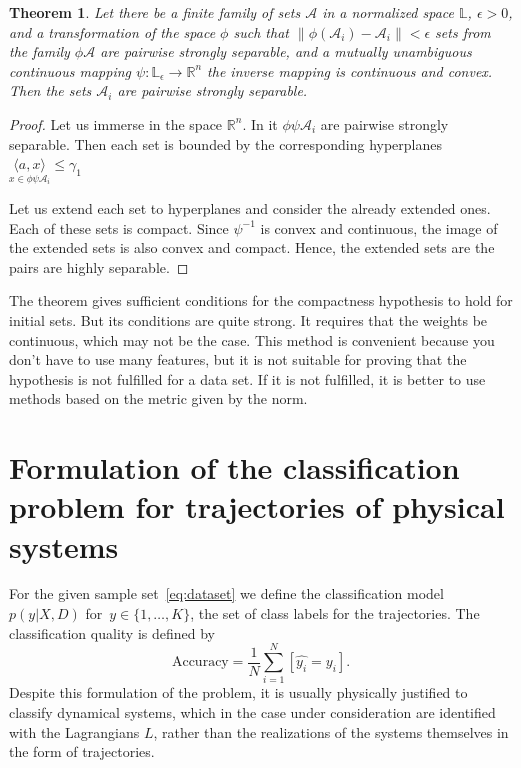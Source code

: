 \documentclass[sn-mathphys-num]{sn-jnl}
\theoremstyle{thmstylethree}
\theoremstyle{thmstyletwo}
\theoremstyle{thmstyleone}
\newtheorem{theorem}{Theorem}
\begin{document}
\begin{theorem} \label{r_theorem}
Let there be a finite family of sets $\mathcal{A}$ in a normalized space $\mathbb{L}$, $\epsilon > 0$, and a transformation of the space $\phi$ such that $\|\phi(\mathcal{A}_{i}) - \mathcal{A}_{i}\| < \epsilon$ sets from the family $\phi{\mathcal{A}}$ are pairwise
strongly separable, and a mutually unambiguous continuous mapping $\psi: \mathbb{L}_{\epsilon} \rightarrow \mathbb{R}^{n}$ the inverse mapping is continuous and convex. Then the sets $\mathcal{A}_{i}$ are pairwise strongly separable.
\end{theorem}

\begin{proof}
Let us immerse in the space $\mathbb{R}^{n}$. In it $\phi\psi \mathcal{A}_{i}$ are pairwise strongly separable. Then each set is bounded by the corresponding hyperplanes $\underset{x \in \phi\psi\mathcal{A}_{i}}{\langle a, x \rangle}\leq \gamma_{1}$

Let us extend each set to hyperplanes and consider the already extended ones. Each of these
sets is compact. Since $\psi^{-1}$ is convex and continuous, the image of the extended sets is also convex and compact. Hence, the extended sets are the pairs are highly separable.
\end{proof}

The theorem gives sufficient conditions for the compactness hypothesis to hold for initial
sets. But its conditions are quite strong. It requires that the weights be continuous, which may
not be the case. This method is convenient because you don't have to use many features, but it
is not suitable for proving that the hypothesis is not fulfilled for a data set. If it is not fulfilled, it is better to use methods based on the metric given by the norm.


\section{Formulation of the classification problem for trajectories of physical systems} \label{sec:classification}
For the given sample set~\eqref{eq:dataset} we define the classification model~$p({y}|X, D)$ for~${y} \in \{1,\dots,K\}$, the set of  class labels for the trajectories. The classification quality is defined by 
\[
\text{Accuracy} = \frac{1}{N} \sum_{i = 1}^N \left[\hat{y_i} = y_i\right].
\]
Despite this formulation of the problem, it is usually physically justified to classify dynamical systems, which in the case under consideration are identified with the Lagrangians $L$, rather than the realizations of the systems themselves in the form of trajectories.
\end{document}
